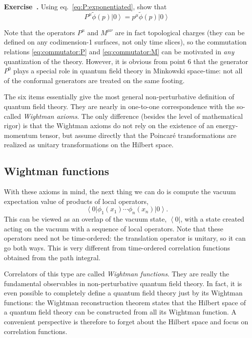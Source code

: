 \documentclass[a4paper,12pt]{article}
\newcommand{\ket}[1]{\left| #1 \right\rangle}
\newcommand{\bra}[1]{\left\langle #1 \right|}
\numberwithin{equation}{section}
\newcounter{exercise}[section]
\newenvironment{exercise}[1][]%
	{\refstepcounter{exercise}\bigskip
	\begin{mdframed}[backgroundcolor=gray!20, linewidth=0]
	\noindent\textbf{Exercise~\thesection.\theexercise #1} \rmfamily}
  	{\end{mdframed}\bigskip}
\begin{document}
%
\begin{exercise}
	Using eq.~\eqref{eq:P:exponentiated}, show that 
	$$ 
		P^\mu \widetilde{\phi}(p) \ket{0}
		= p^\mu \widetilde{\phi}(p) \ket{0} 
	$$
\end{exercise}
%
Note that the operators $P^\mu$ and $M^{\mu\nu}$ are in fact topological charges (they can be defined on any codimension-1 surfaces, not only time slices), so the commutation relations \eqref{eq:commutator:P} and \eqref{eq:commutator:M} can be motivated in \emph{any} quantization of the theory.
However, it is obvious from point 6 that the generator $P^0$ plays a special role in quantum field theory in Minkowski space-time: not all of the conformal generators are treated on the same footing.

The six items essentially give the most general non-perturbative definition of quantum field theory. They are nearly in one-to-one correspondence with the so-called \emph{Wightman axioms}. The only difference (besides the level of mathematical rigor) is that the Wightman axioms do not rely on the existence of an energy-momentum tensor, but assume directly that the Poincaré transformations are realized as unitary transformations on the Hilbert space.

\subsection{Wightman functions}

With these axioms in mind, the next thing we can do is compute the vacuum expectation value of products of local operators,
\begin{equation}
	\bra{0} \phi_1(x_1) \cdots \phi_n(x_n) \ket{0}.
\end{equation}
This can be viewed as an overlap of the vacuum state, $\bra{0}$, with a  state created acting on the vacuum with a sequence of local operators. Note that these operators need not be time-ordered: the translation operator is unitary, so it can go both ways. This is very different from time-ordered correlation functions obtained from the path integral.

Correlators of this type are called \emph{Wightman functions}. They are really the fundamental observables in non-perturbative quantum field theory. In fact, it is even possible to completely define a quantum field theory just by its Wightman functions: the Wightman reconstruction theorem states that the Hilbert space of a quantum field theory can be constructed from all its Wightman function.
A convenient perspective is therefore to forget about the Hilbert space and focus on correlation functions.
\end{document}
